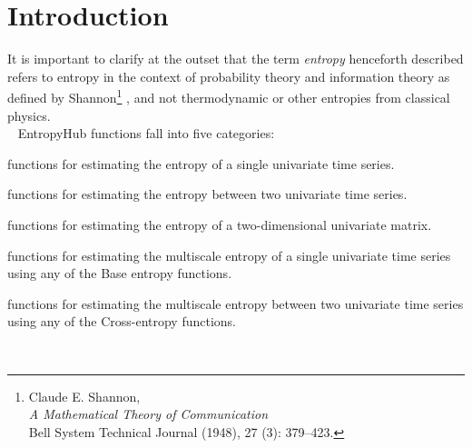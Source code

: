 \documentclass[12pt, a4paper, titlepage, openany]{book}
\newcommand\chapterimage[2][]{%
  \AddToShipoutPictureBG*{%
    \AtTextUpperLeft{%
     \hspace*{\textwidth}%
      \llap{%
            \texttt{[image: \#2]}}}}}%
\begin{document}
\vspace{10cm}
\renewcommand\contentsname{Table of Contents}
\renewcommand{\bibname}{Bibliographie}
\textbf{\tableofcontents}


\mainmatter

\chapter{\textbf{Introduction}}
\chapterimage[width=16cm, height=3cm]{Chapter Banner2.png}

\vspace{50mm}
It is important to clarify at the outset that the term \emph{entropy} henceforth described refers to entropy in the context of probability theory and information theory as defined by Shannon\footnote{Claude E.  Shannon,\\ \indent\indent \emph{A Mathematical Theory of Communication}
\\\indent\indent Bell System Technical Journal (1948), 27 (3): 379–423.}
, and not thermodynamic or other entropies from classical physics.\\ \ \newline
EntropyHub functions fall into five categories:\\
\begin{description}[labelsep=5mm, labelwidth=3cm, nosep,style=multiline,leftmargin=45mm]
\item[Base] functions for estimating the entropy of a single univariate time series.
\item[Cross] functions for estimating the entropy between two univariate time series.
\item[Bidimensional] functions for estimating the entropy of a two-dimensional univariate matrix.
\item[Multiscale] functions for estimating the multiscale entropy of a single univariate time series using any of the Base entropy functions.
\item [Multiscale Cross-] functions for estimating the multiscale entropy between two univariate time series using any of the Cross-entropy functions.
\end{description}
\ \noindent \newline
\indent{}\\
\end{document}
